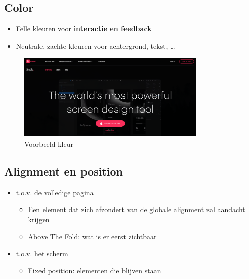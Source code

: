 \documentclass{article}
\newcommand{\bold}[1]{\textbf{#1}}
\begin{document}
\subsection{Color}
\begin{itemize}
    \item Felle kleuren voor \bold{interactie en feedback}
    \item Neutrale, zachte kleuren voor achtergrond, tekst, \dots
\end{itemize}

\begin{figure}[H]
    \centering
    \includegraphics[width=0.8\textwidth]{img/Screenshot_20200302_084555.png}
    \caption{Voorbeeld kleur}
\end{figure}


\subsection{Alignment en position}

\begin{itemize}
    \item t.o.v. de volledige pagina
    \begin{itemize}
        \item Een element dat zich afzondert van de globale alignment zal aandacht krijgen
        \item Above The Fold: wat is er eerst zichtbaar
    \end{itemize}
    \item t.o.v. het scherm
    \begin{itemize}
        \item Fixed position: elementen die blijven staan
    \end{itemize}
\end{itemize}
\end{document}
